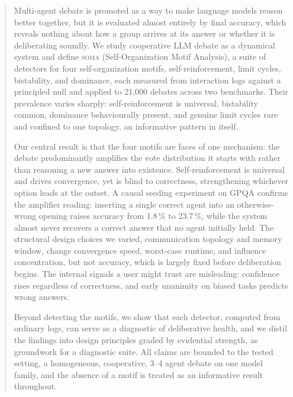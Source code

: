 \documentclass[12pt]{article}
\newcommand{\suitename}{\textsc{soma}}
\begin{document}
\begin{abstract}

Multi-agent debate is promoted as a way to make language models reason better
together, but it is evaluated almost entirely by final accuracy, which reveals
nothing about how a group arrives at its answer or whether it is deliberating
soundly. We study cooperative LLM debate as a dynamical system and define
\suitename{} (Self-Organization Motif Analysis), a suite of detectors for four
self-organization motifs, self-reinforcement, limit cycles,
bistability, and dominance, each measured from interaction logs against a
principled null and applied to 21{,}000 debates across two benchmarks. Their
prevalence varies sharply: self-reinforcement is universal, bistability common,
dominance behaviourally present, and genuine limit cycles rare and confined to one
topology, an informative pattern in itself.

Our central result is that the four motifs are faces of one mechanism: the debate
predominantly amplifies the vote distribution it starts with rather than reasoning
a new answer into existence. Self-reinforcement is universal and drives
convergence, yet is blind to correctness, strengthening whichever option leads at
the outset. A causal seeding experiment on GPQA confirms the amplifier reading:
inserting a single correct agent into an otherwise-wrong opening raises accuracy
from $1.8\,\%$ to $23.7\,\%$, while the system almost never recovers a correct answer that
no agent initially held. The structural design choices we varied, communication topology and
memory window, change convergence speed, worst-case runtime, and influence
concentration, but not accuracy, which is largely fixed before deliberation begins.
The internal signals a user might trust are misleading: confidence rises regardless
of correctness, and early unanimity on biased tasks predicts wrong answers.

Beyond detecting the motifs, we show that each detector, computed from ordinary
logs, can serve as a diagnostic of deliberative health, and we distil the findings
into design principles graded by evidential strength, as groundwork for a diagnostic
suite. All claims are bounded to the tested setting, a homogeneous, cooperative,
3--4 agent debate on one model family, and the absence of a motif is treated as an
informative result throughout.

\end{abstract}

\newpage

\end{document}
